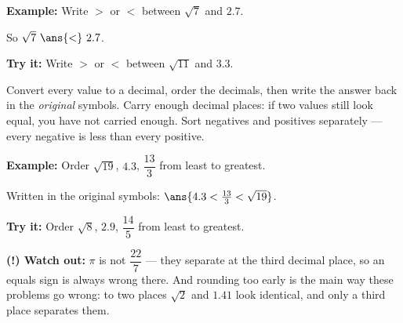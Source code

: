 \documentclass[12pt]{article}
\begin{document}
\begin{examplebox}
\textbf{Example:} Write $>$ or $<$ between $\sqrt{7}$ and $2.7$.

So $\sqrt{7}\ \ans{<}\ 2.7$.
\end{examplebox}

\begin{tryitbox}
\textbf{Try it:} Write $>$ or $<$ between $\sqrt{11}$ and $3.3$.\\[2pt]
\end{tryitbox}


\begin{formulabox}
Convert every value to a decimal, order the decimals, then write the answer
back in the \emph{original} symbols. Carry enough decimal places: if two values
still look equal, you have not carried enough. Sort negatives and positives
separately --- every negative is less than every positive.
\end{formulabox}

\begin{examplebox}
\textbf{Example:} Order $\sqrt{19}$, $4.3$, $\dfrac{13}{3}$ from least to
greatest.

Written in the original symbols:
$\ans{4.3 < \tfrac{13}{3} < \sqrt{19}}$.
\end{examplebox}

\begin{tryitbox}
\textbf{Try it:} Order $\sqrt{8}$, $2.9$, $\dfrac{14}{5}$ from least to
greatest.\\[2pt]
\end{tryitbox}

\begin{watchoutbox}
\textbf{(!) Watch out:} $\pi$ is not $\dfrac{22}{7}$ --- they separate at the
third decimal place, so an equals sign is always wrong there. And rounding too
early is the main way these problems go wrong: to two places $\sqrt{2}$ and
$1.41$ look identical, and only a third place separates them.
\end{watchoutbox}
\end{document}
